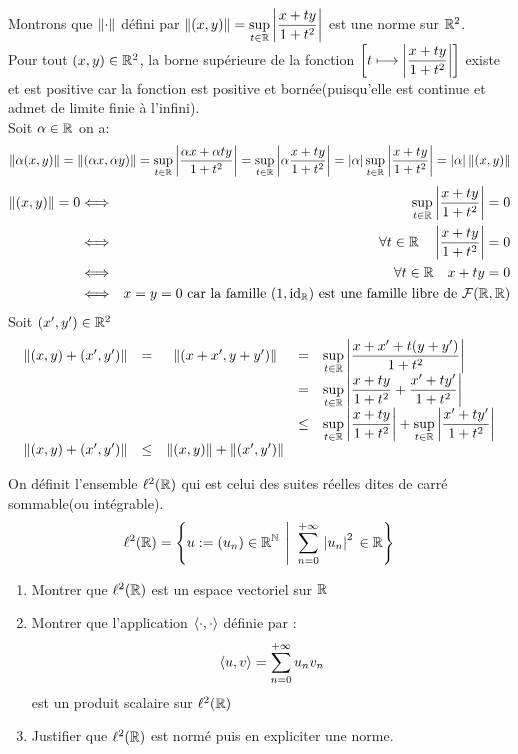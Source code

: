 \documentclass[12pt,a4paper]{article}
\begin{document}
	\begin{exo}
	 Montrons que $\norm{\cdot}$ défini par 
	$\norm{(x,y)}=\sup\limits_{t\in \ens{R}} \abs{\grandm\frac{x+ty}{1+t^2}}$
	est une norme sur $\ens{R}^2$.\\
	Pour tout $(x,y)\in \ens{R}^2$, la borne supérieure de la fonction $\grandm \left[ t\longmapsto\grandm \abs{\frac{x+ty}{1+t^2}} \right] $ existe et est positive car la fonction est positive et bornée(puisqu'elle est continue et admet de limite finie à l'infini).\\
	Soit $\alpha \in \ens{R}$ on a: $$\norm{\alpha (x,y)}=\norm{(\alpha x, \alpha y)}=\sup\limits_{t\in \ens{R}}\abs{\grandm\frac{\alpha x+\alpha t y}{1+t^2}}=\sup\limits_{t\in \ens{R}}\abs{\grandm \alpha \frac{ x+t y}{1+t^2}}=\abs{\alpha}\sup\limits_{t\in \ens{R}}\abs{\grandm \frac{ x+t y}{1+t^2}}=\abs{\alpha} \norm{(x,y)} $$
	\begin{eqnarray*}
		\norm{(x,y)}=0 	&\Longleftrightarrow& \sup\limits_{t\in \ens{R}} \abs{\grandm\frac{x+ty}{1+t^2}}=0\\
		&\Longleftrightarrow& \forall t \in \ens{R}\quad \abs{\grandm\frac{x+ty}{1+t^2}}=0\\
		&\Longleftrightarrow& \forall t \in \ens{R}\quad x+ty=0\\
		&\Longleftrightarrow& x=y=0 \text{ car la famille } (1,\text{id}_\ens{R}) \text{ est une famille libre de }  \mathcal{F}(\ens{R},\ens{R})
	\end{eqnarray*}
	Soit $(x',y')\in \ens{R}^2 $
	\begin{equation*}
		\begin{array}{rrcrl}
			\norm{(x,y)+(x',y')}&=	&\norm{(x+x',y+y')}&=		&\sup\limits_{t\in \ens{R}}\abs{\grandm \frac{ x+x'+t(y+y') }{1+t^2}}\\
			&	&				   &=		&\sup\limits_{t\in \ens{R}}\abs{\grandm \frac{ x+t y}{1+t^2}+\frac{ x'+t y'}{1+t^2}}\\
			&	&				   &\leq	& \sup\limits_{t\in \ens{R}}\abs{\grandm \frac{ x+ty }{1+t^2}}+\sup\limits_{t\in \ens{R}}\abs{\grandm \frac{ x'+t y' }{1+t^2}}\\
			\norm{(x,y)+(x',y')}&\leq& \norm{(x,y)}+\norm{(x',y')} 
		\end{array}
	\end{equation*}
	\end{exo}
	\begin{exo}
		
	  On définit l'ensemble $\ell ^2(\ens{R})$ qui est celui des suites réelles dites de carré sommable(ou intégrable).
	$$\ell^2(\ens{R})=\ensemble{u:=(u_n)\in \ens{R}^{\ens{N}}}{\gesp\somme{n=0}{+\infty}\abs{u_n}^2\, \in \ens{R}} $$ 
	\begin{enumerate}
		\item Montrer que $\ell^2(\ens{R}) $ est un espace vectoriel sur $\ens{R}$
		\item Montrer que l'application $\prdtscal{\cdot}{\cdot}$ définie par : $$\prdtscal{u}{v}=\somme{n=0}{+\infty} u_n v_n $$ est un produit scalaire sur $\ell^2(\ens{R})$
		\item Justifier que $\ell^2(\ens{R})$ est normé puis en expliciter une norme.  
	\end{enumerate}
	\end{exo}
\end{document}

